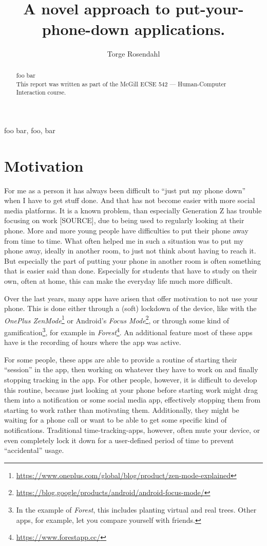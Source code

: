 \documentclass[conference]{IEEEtran}
\title{\projectname\\\Large{A novel approach to put-your-phone-down applications.}}
\author{Torge Rosendahl}
\begin{document}
\maketitle

\begin{abstract}
foo bar
\\
This report was written as part of the McGill ECSE 542 --- Human-Computer Interaction course.
\end{abstract}

\begin{IEEEkeywords}
foo bar, foo, bar
\end{IEEEkeywords}

\section{Motivation}
For me as a person it has always been difficult to ``just put my phone down'' when I have to get stuff done. And that has not become easier with more social media platforms. It is a known problem, than especially Generation Z has trouble focusing on work [SOURCE], due to being used to regularly looking at their phone. More and more young people have difficulties to put their phone away from time to time. What often helped me in such a situation was to put my phone away, ideally in another room, to just not think about having to reach it. But especially the part of putting your phone in another room is often something that is easier said than done. Especially for students that have to study on their own, often at home, this can make the everyday life much more difficult.

Over the last years, many apps have arisen that offer motivation to not use your phone. This is done either through a (soft) lockdown of the device, like with the \textit{OnePlus ZenMode}\footnote{\url{https://www.oneplus.com/global/blog/product/zen-mode-explained}} or Android's \textit{Focus Mode}\footnote{\url{https://blog.google/products/android/android-focus-mode/}}, or through some kind of gamification\footnote{In the example of \textit{Forest}, this includes planting virtual and real trees. Other apps, for example, let you compare yourself with friends.}, for example in \textit{Forest}\footnote{\url{https://www.forestapp.cc/}}. An additional feature most of these apps have is the recording of hours where the app was active.

For some people, these apps are able to provide a routine of starting their ``session'' in the app, then working on whatever they have to work on and finally stopping tracking in the app. For other people, however, it is difficult to develop this routine, because just looking at your phone before starting work might drag them into a notification or some social media app, effectively stopping them from starting to work rather than motivating them. Additionally, they might be waiting for a phone call or want to be able to get some specific kind of notifications. Traditional time-tracking-apps, however, often mute your device, or even completely lock it down for a user-defined period of time to prevent ``accidental'' usage.
\end{document}
